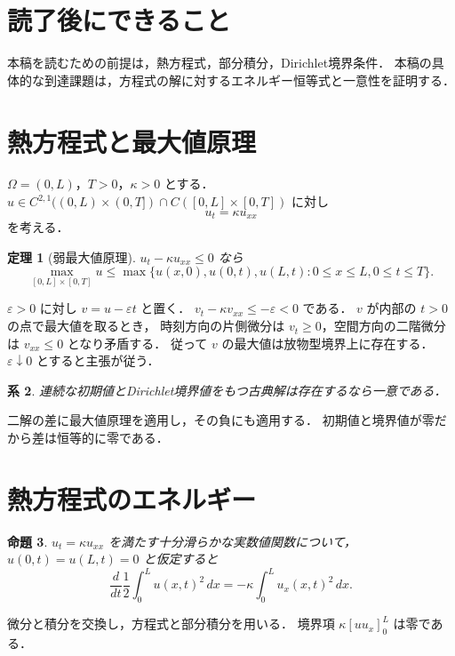 \documentclass[a5paper,10pt,onecolumn]{jsarticle}
\makeatletter
\theoremstyle{mathnotetheorem}
\newtheorem{theorem}{定理}[section]
\newtheorem{proposition}[theorem]{命題}
\newtheorem{corollary}[theorem]{系}
\renewcommand{\proofname}{証明}
\renewenvironment{proof}[1][\proofname]{%
  \par\pushQED{\qed}\normalfont\topsep4\p@\@plus2\p@\relax
  \trivlist\item[\hskip\labelsep\bfseries #1]\ignorespaces
}{\popQED\endtrivlist\@endpefalse}
\makeatother
\begin{document}
\section*{読了後にできること}
本稿を読むための前提は，熱方程式，部分積分，Dirichlet境界条件．
本稿の具体的な到達課題は，方程式の解に対するエネルギー恒等式と一意性を証明する．

\section{熱方程式と最大値原理}
$\Omega=(0,L)$，$T>0$，$\kappa>0$ とする．
$u\in C^{2,1}((0,L)\times(0,T])\cap C([0,L]\times[0,T])$ に対し
\[ u_t=\kappa u_{xx} \]
を考える．
\begin{theorem}[弱最大値原理]
$u_t-\kappa u_{xx}\le0$ なら
\[
 \max_{[0,L]\times[0,T]}u
 \le \max\{u(x,0),u(0,t),u(L,t):0\le x\le L,0\le t\le T\}.
\]
\end{theorem}
\begin{proof}
$\varepsilon>0$ に対し $v=u-\varepsilon t$ と置く．
$v_t-\kappa v_{xx}\le-\varepsilon<0$ である．
$v$ が内部の $t>0$ の点で最大値を取るとき，
時刻方向の片側微分は $v_t\ge0$，空間方向の二階微分は
$v_{xx}\le0$ となり矛盾する．
従って $v$ の最大値は放物型境界上に存在する．
$\varepsilon\downarrow0$ とすると主張が従う．
\end{proof}
\begin{corollary}
連続な初期値とDirichlet境界値をもつ古典解は存在するなら一意である．
\end{corollary}
\begin{proof}
二解の差に最大値原理を適用し，その負にも適用する．
初期値と境界値が零だから差は恒等的に零である．
\end{proof}
\section{熱方程式のエネルギー}
\begin{proposition}
$u_t=\kappa u_{xx}$ を満たす十分滑らかな実数値関数について，
$u(0,t)=u(L,t)=0$ と仮定すると
\[
 \frac{d}{dt}\frac12\int_0^L u(x,t)^2\,dx
 =-\kappa\int_0^L u_x(x,t)^2\,dx.
\]
\end{proposition}
\begin{proof}
微分と積分を交換し，方程式と部分積分を用いる．
境界項 $\kappa[u u_x]_0^L$ は零である．
\end{proof}
\end{document}

